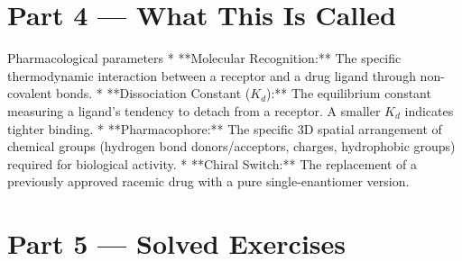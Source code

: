 \documentclass[12pt, a4paper]{book}
\begin{document}
\newpage

\section{Part 4 --- What This Is Called}

\begin{namedconcept}{Pharmacological parameters}
* **Molecular Recognition:** The specific thermodynamic interaction between a receptor and a drug ligand through non-covalent bonds.
* **Dissociation Constant ($K_d$):** The equilibrium constant measuring a ligand's tendency to detach from a receptor. A smaller $K_d$ indicates tighter binding.
* **Pharmacophore:** The specific 3D spatial arrangement of chemical groups (hydrogen bond donors/acceptors, charges, hydrophobic groups) required for biological activity.
* **Chiral Switch:** The replacement of a previously approved racemic drug with a pure single-enantiomer version.
\end{namedconcept}

\newpage

\section{Part 5 --- Solved Exercises}
\end{document}
